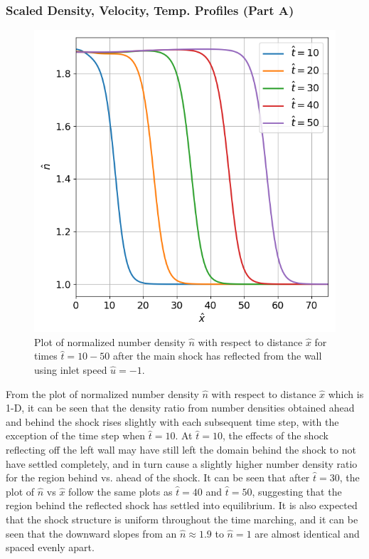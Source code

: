 \documentclass[a4paper]{article}
\begin{document}
\subsubsection{Scaled Density, Velocity, Temp. Profiles (Part A)}
\begin{figure}[hbt!]
    \centering
    \includegraphics[width=14cm]{plots/problem_a_nd.png}
    \caption{\centering Plot of normalized number density $\hat{n}$ with respect to distance $\hat{x}$ for times $\hat{t} = 10 - 50$ after the main shock has reflected from the wall using inlet speed $\hat{u} = -1$.} 
    \label{problem_a_nd}
\end{figure}
From the plot of normalized number density $\hat{n}$ with respect to distance $\hat{x}$ which is 1-D, it can be seen that the density ratio from number densities obtained ahead and behind the shock rises slightly with each subsequent time step, with the exception of the time step when $\hat{t} = 10$. At $\hat{t} = 10$, the effects of the shock reflecting off the left wall may have still left the domain behind the shock to not have settled completely, and in turn cause a slightly higher number density ratio for the region behind vs. ahead of the shock. It can be seen that after $\hat{t} = 30$, the plot of $
\hat{n}$ vs $\hat{x}$ follow the same plots as $\hat{t} = 40$ and $\hat{t} = 50$, suggesting that the region behind the reflected shock has settled into equilibrium. It is also expected that the shock structure is uniform throughout the time marching, and it can be seen that the downward slopes from an $\hat{n} \approx 1.9$ to $\hat{n} = 1$ are almost identical and spaced evenly apart. 
\end{document}
